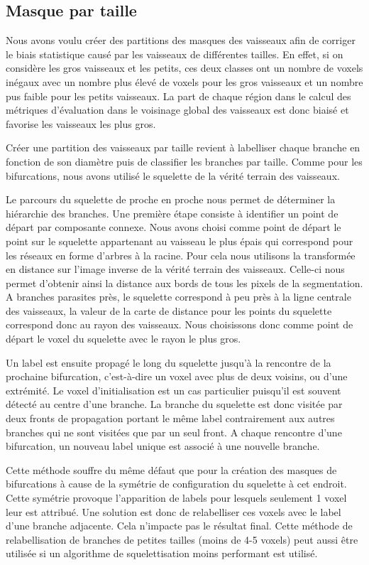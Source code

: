 \subsection{Masque par taille}

Nous avons voulu créer des partitions des masques des vaisseaux afin de corriger le biais statistique causé par les vaisseaux de différentes tailles. En effet, si on considère les gros vaisseaux et les petits, ces deux classes ont un nombre de voxels inégaux avec un nombre plus élevé de voxels pour les gros vaisseaux et un nombre pus faible pour les petits vaisseaux. La part de chaque région dans le calcul des métriques d'évaluation dans le voisinage global des vaisseaux est donc biaisé et favorise les vaisseaux les plus gros.

Créer une partition des vaisseaux par taille revient à labelliser chaque branche en fonction de son diamètre puis de classifier les branches par taille. Comme pour les bifurcations, nous avons utilisé le squelette de la vérité terrain des vaisseaux.

Le parcours du squelette de proche en proche nous permet de déterminer la hiérarchie des branches. Une première étape consiste à identifier un point de départ par composante connexe. Nous avons choisi comme point de départ le point sur le squelette appartenant au vaisseau le plus épais qui correspond pour les réseaux en forme d'arbres à la racine. Pour cela nous utilisons la transformée en distance sur l'image inverse de la vérité terrain des vaisseaux. Celle-ci nous permet d'obtenir ainsi la distance aux bords de tous les pixels de la segmentation. A branches parasites près, le squelette correspond à peu près à la ligne centrale des vaisseaux, la valeur de la carte de distance pour les points du squelette correspond donc au rayon des vaisseaux. Nous choisissons donc comme point de départ le voxel du squelette avec le rayon le plus gros.

Un label est ensuite propagé le long du squelette jusqu'à la rencontre de la prochaine bifurcation, c'est-à-dire un voxel avec plus de deux voisins, ou d'une extrémité. Le voxel d'initialisation est un cas particulier puisqu'il est souvent détecté au centre d'une branche. La branche du squelette est donc visitée par deux fronts de propagation portant le même label contrairement aux autres branches qui ne sont visitées que par un seul front. A chaque rencontre d'une bifurcation, un nouveau label unique est associé à une nouvelle branche.

Cette méthode souffre du même défaut que pour la création des masques de bifurcations à cause de la symétrie de configuration du squelette à cet endroit. Cette symétrie provoque l'apparition de labels pour lesquels seulement 1 voxel leur est attribué. Une solution est donc de relabelliser ces voxels avec le label d'une branche adjacente. Cela n'impacte pas le résultat final. Cette méthode de relabellisation de branches de petites tailles (moins de 4-5 voxels) peut aussi être utilisée si un algorithme de squelettisation moins performant est utilisé.

